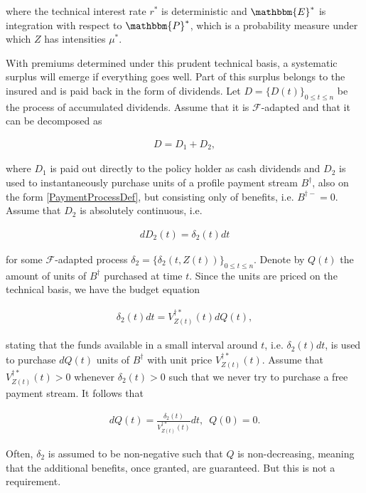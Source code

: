\documentclass{article}
\newcommand{\1}[1]{\mathbbm{1}_{\left\lbrace #1 \right\rbrace}}
\theoremstyle{break}
\theoremstyle{remark}
\newenvironment{remark}
  {\pushQED{\qed}\renewcommand{\qedsymbol}{\scalebox{1.4}{$\circ$}}\remarkx}
  {\popQED\endremarkx}
\numberwithin{equation}{section}
\begin{document}
where the technical interest rate $r^*$ is deterministic and $\mathbbm{E}^*$ is integration with respect to $\mathbbm{P}^*$, which is a probability measure under which $Z$ has intensities $\mu^*$.

With premiums determined under this prudent technical basis, a systematic surplus will emerge if everything goes well. Part of this surplus belongs to the insured and is paid back in the form of dividends. Let $D = \{ D(t) \}_{0 \leq t \leq n}$ be the process of accumulated dividends. Assume that it is $\mathcal{F}$-adapted and that it can be decomposed as

\begin{align*}
D = D_1 + D_2,
\end{align*}

where $D_1$ is paid out directly to the policy holder as cash dividends and $D_2$ is used to instantaneously purchase units of a profile payment stream $B^\dagger$, also on the form \ref{PaymentProcessDef}, but consisting only of benefits, i.e. $B^{\dagger -}=0$. Assume that $D_2$ is absolutely continuous, i.e.

\begin{align*}
dD_2(t) = \delta_2(t) dt
\end{align*}

for some $\mathcal{F}$-adapted process $\delta_2 = \{ \delta_2(t,Z(t)) \}_{0 \leq t \leq n}$. Denote by $Q(t)$ the amount of units of $B^\dagger$ purchased at time $t$. Since the units are priced on the technical basis, we have the budget equation

\begin{align*}
\delta_2(t) dt = V_{Z(t)}^{\dagger*}(t) dQ(t),
\end{align*}

stating that the funds available in a small interval around $t$, i.e. $\delta_2(t) dt$, is used to purchase $dQ(t)$ units of $B^\dagger$ with unit price $V_{Z(t)}^{\dagger*}(t)$. Assume that $V_{Z(t)}^{\dagger*}(t)>0$ whenever $\delta_2(t)>0$ such that we never try to purchase a free payment stream. It follows that

\begin{align} \label{QDynamics}
dQ(t) = \frac{\delta_2(t)}{V_{Z(t)}^{\dagger*}(t)}  dt, \, \, \, Q(0)=0.
\end{align}

\begin{remark}
	Often, $\delta_2$ is assumed to be non-negative such that $Q$ is non-decreasing, meaning that the additional benefits, once granted, are guaranteed. But this is not a requirement.
\end{remark}
\end{document}
